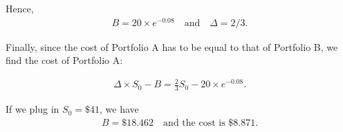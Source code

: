 \begin{frame}[fragile,t]
\begin{mysol}
	Hence,
	\begin{align*}
		B = 20 \times e^{-0.08} \quad \text{and} \quad
		\Delta = 2/3.
	\end{align*}
	\bigskip

	Finally, since the cost of Portfolio A has to be equal to that of Portfolio B, we find the cost of Portfolio A:

	\begin{align*}
		\Delta \times S_0 - B = \frac{2}{3} S_0 - 20 \times e^{-0.08}.
	\end{align*}
	\bigskip

	If we plug in $S_0=\$41$, we have
	\begin{align*}
		B=\$18.462 \quad \text{and the cost is \$ 8.871.}
	\end{align*}
	\myEnd
\end{mysol}
\end{frame}

